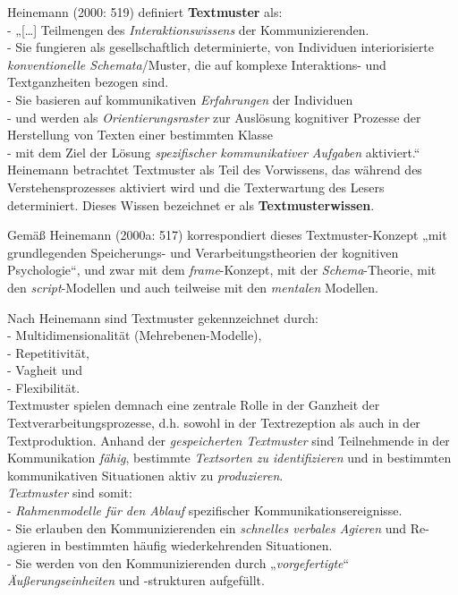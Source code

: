 \documentclass[
  letterpaper,
]{scrbook}
\begin{document}
Heinemann (2000: 519) definiert \textbf{Textmuster} als:\\
- „{[}\ldots{]} Teilmengen des \emph{Interaktionswissens} der
Kommunizierenden.\\
- Sie fungieren als gesellschaftlich determinierte, von Individuen
interiorisierte \emph{konventionelle Schemata}/Muster, die auf komplexe
Interaktions- und Textganzheiten bezogen sind.\\
- Sie basieren auf kommunikativen \emph{Erfahrungen} der Individuen\\
- und werden als \emph{Orientierungsraster} zur Auslösung kognitiver
Prozesse der Herstellung von Texten einer bestimmten Klasse\\
- mit dem Ziel der Lösung \emph{spezifischer kommunikativer Aufgaben}
aktiviert.``\\

Heinemann betrachtet Textmuster als Teil des Vorwissens, das während des
Verstehensprozesses aktiviert wird und die Texterwartung des Lesers
determiniert. Dieses Wissen bezeichnet er als \textbf{Textmusterwissen}.

Gemäß Heinemann (2000a: 517) korrespondiert dieses Textmuster-Konzept
„mit grundlegenden Speicherungs- und Verarbeitungstheorien der
kognitiven Psychologie``, und zwar mit dem \emph{frame}-Konzept, mit der
\emph{Schema}-Theorie, mit den \emph{script}-Modellen und auch teilweise
mit den \emph{mentalen} Modellen.

Nach Heinemann sind Textmuster gekennzeichnet durch:\\
- Multidimensionalität (Mehrebenen-Modelle),\\
- Repetitivität,\\
- Vagheit und\\
- Flexibilität.\\

Textmuster spielen demnach eine zentrale Rolle in der Ganzheit der
Textverarbeitungsprozesse, d.h. sowohl in der Textrezeption als auch in
der Textproduktion. Anhand der \emph{gespeicherten Textmuster} sind
Teilnehmende in der Kommunikation \emph{fähig}, bestimmte
\emph{Textsorten zu identifizieren} und in bestimmten kommunikativen
Situationen aktiv zu \emph{produzieren}.\\

\emph{Textmuster} sind somit:\\
- \emph{Rahmenmodelle für den Ablauf} spezifischer
Kommunikationsereignisse.\\
- Sie erlauben den Kommunizierenden ein \emph{schnelles verbales
Agieren} und Re-agieren in bestimmten häufig wiederkehrenden
Situationen.\\
- Sie werden von den Kommunizierenden durch „\emph{vorgefertigte}``
\emph{Äußerungseinheiten} und -strukturen aufgefüllt.\\
\end{document}
